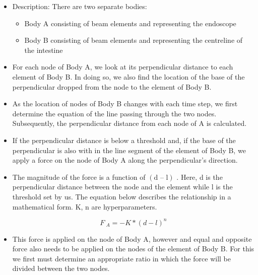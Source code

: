 \documentclass[12pt]{report}
\begin{document}
\begin{itemize}
	\item Description: There are two separate bodies:\par

\begin{itemize}
	\item Body A consisting of beam elements and representing the endoscope\par

	\item Body B consisting of beam elements and representing the centreline of the intestine\par


\end{itemize}
	\item For each node of Body A, we look at its perpendicular distance to each element of Body B. In doing so, we also find the location of the base of the perpendicular dropped from the node to the element of Body B.\par

	\item As the location of nodes of Body B changes with each time step, we first determine the equation of the line passing through the two nodes. Subsequently, the perpendicular distance from each node of A is calculated. \par

	\item If the perpendicular distance is below a threshold and, if the base of the perpendicular is also with in the line segment of the element of Body B, we apply a force on the node of Body A along the perpendicular’s direction.\par

	\item The magnitude of the force is a function of  \(  \left( \text{d – l} \right)  \) . Here, d is the perpendicular distance between the node and the element while l is the threshold set by us. The equation below describes the relationship in a mathematical form. K, n are hyperparameters.\par

 \[ F~_{A}= -K \ast  \left( d- l \right) ^{n} \] \par

	\item This force is applied on the node of Body A, however and equal and opposite force also needs to be applied on the nodes of the element of Body B. For this we first must determine an appropriate ratio in which the force will be divided between the two nodes.\par


\end{itemize}
\end{document}

